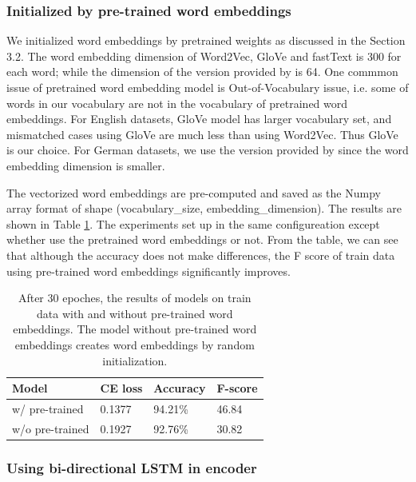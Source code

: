 \documentclass[11pt,a4paper]{article}
\begin{document}
\subsubsection{Initialized by pre-trained word embeddings}
We initialized word embeddings by pretrained weights as discussed in the Section 3.2. The word embedding dimension of Word2Vec, GloVe and fastText is 300 for each word; while the dimension of the version provided by \citet{goyal2018continuous} is 64. One commmon issue of pretrained word embedding model is Out-of-Vocabulary issue, i.e. some of words in our vocabulary are not in the vocabulary of pretrained word embeddings. For English datasets, GloVe model has larger vocabulary set, and mismatched cases using GloVe are much less than using Word2Vec. Thus GloVe is our choice. For German datasets, we use the version provided by \citet{goyal2018continuous} since the word embedding dimension is smaller.

The vectorized word embeddings are pre-computed and saved as the Numpy array format of shape (vocabulary\_size, embedding\_dimension). The results are shown in Table \ref{embed}. The experiments set up in the same configureation except whether use the pretrained word embeddings or not. From the table, we can see that although the accuracy does not make differences, the F score of train data using pre-trained word embeddings significantly improves.

\begin{table}[ht]
\centering
\caption{After 30 epoches, the results of models on train data with and without pre-trained word embeddings. The model without pre-trained word embeddings creates word embeddings by random initialization. }
\label{embed}
\begin{tabular}{@{}llll@{}}
\toprule
Model                     & CE loss  & Accuracy & F-score \\ \midrule
w/ pre-trained          & 0.1377 & 94.21\%  & 46.84   \\
w/o pre-trained & 0.1927 & 92.76\%  & 30.82   \\ \bottomrule
\end{tabular}
\end{table}

\subsubsection{Using bi-directional LSTM in encoder}
\end{document}
